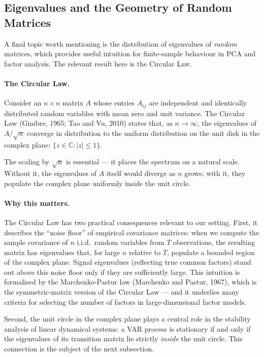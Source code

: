 \documentclass[11pt, a4paper, oneside]{article}
\begin{document}
\subsection{Eigenvalues and the Geometry of Random Matrices}

A final topic worth mentioning is the distribution of eigenvalues of
\emph{random} matrices, which provides useful intuition for finite-sample
behaviour in PCA and factor analysis. The relevant result here is the
Circular Law.

\paragraph{The Circular Law.}
Consider an $n \times n$ matrix $A$ whose entries $A_{ij}$ are
independent and identically distributed random variables with mean
zero and unit variance. The Circular Law (Ginibre, 1965; Tao and Vu,
2010) states that, as $n \to \infty$, the eigenvalues of $A/\sqrt{n}$
converge in distribution to the uniform distribution on the unit disk
in the complex plane: $\{z \in \mathbb{C} : |z| \leq 1\}$.

The scaling by $\sqrt{n}$ is essential — it places the spectrum on a
natural scale. Without it, the eigenvalues of $A$ itself would
diverge as $n$ grows; with it, they populate the complex plane
uniformly inside the unit circle.

\paragraph{Why this matters.}
The Circular Law has two practical consequences relevant to our
setting. First, it describes the ``noise floor'' of empirical
covariance matrices: when we compute the sample covariance of $n$
i.i.d.\ random variables from $T$ observations, the resulting matrix
has eigenvalues that, for large $n$ relative to $T$, populate a
bounded region of the complex plane. Signal eigenvalues (reflecting
true common factors) stand out above this noise floor only if they
are sufficiently large. This intuition is formalised by the
Marchenko-Pastur law (Marchenko and Pastur, 1967), which is the
symmetric-matrix version of the Circular Law — and it underlies many
criteria for selecting the number of factors in large-dimensional
factor models.

Second, the unit circle in the complex plane plays a central role in
the stability analysis of linear dynamical systems: a VAR process is
stationary if and only if the eigenvalues of its transition matrix
lie strictly \emph{inside} the unit circle. This connection is the
subject of the next subsection.
\end{document}
